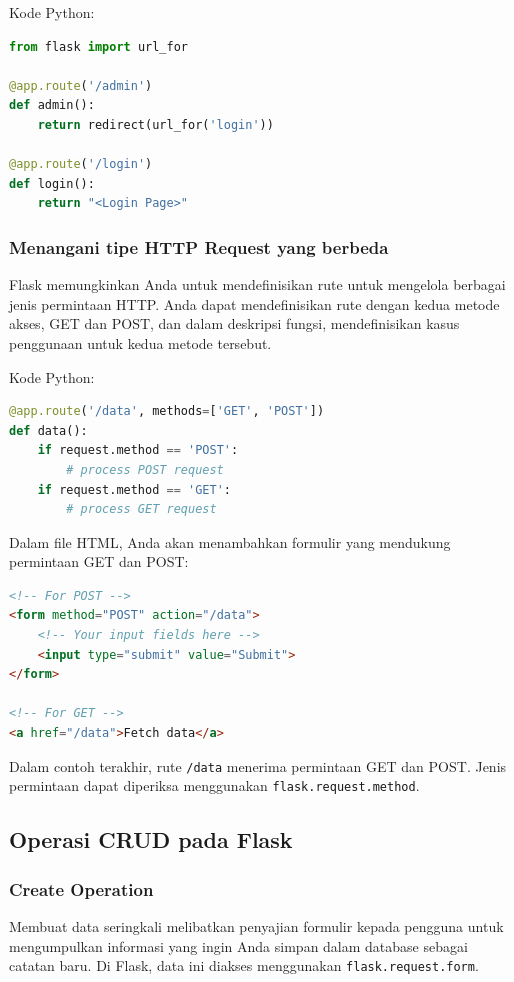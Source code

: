 \documentclass{article}
\begin{document}
Kode Python:
\begin{lstlisting}[language=Python, caption={}, captionpos=b]
from flask import url_for

@app.route('/admin')
def admin():
    return redirect(url_for('login'))

@app.route('/login')
def login():
    return "<Login Page>"
\end{lstlisting}

\subsubsection{Menangani tipe HTTP Request yang berbeda}
Flask memungkinkan Anda untuk mendefinisikan rute untuk mengelola berbagai jenis permintaan HTTP. Anda dapat mendefinisikan rute dengan kedua metode akses, GET dan POST, dan dalam deskripsi fungsi, mendefinisikan kasus penggunaan untuk kedua metode tersebut.

Kode Python:
\begin{lstlisting}[language=Python, caption={}, captionpos=b]
@app.route('/data', methods=['GET', 'POST'])
def data():
    if request.method == 'POST':
        # process POST request
    if request.method == 'GET':
        # process GET request
\end{lstlisting}

Dalam file HTML, Anda akan menambahkan formulir yang mendukung permintaan GET dan POST:
\begin{lstlisting}[language=HTML, caption={}, captionpos=b]
<!-- For POST -->
<form method="POST" action="/data">
    <!-- Your input fields here -->
    <input type="submit" value="Submit">
</form>

<!-- For GET -->
<a href="/data">Fetch data</a>
\end{lstlisting}

Dalam contoh terakhir, rute \verb|/data| menerima permintaan GET dan POST. Jenis permintaan dapat diperiksa menggunakan \verb|flask.request.method|.

\subsection{Operasi CRUD pada Flask}
\subsubsection{Create Operation}
Membuat data seringkali melibatkan penyajian formulir kepada pengguna untuk mengumpulkan informasi yang ingin Anda simpan dalam database sebagai catatan baru. Di Flask, data ini diakses menggunakan \verb|flask.request.form|.
\end{document}
